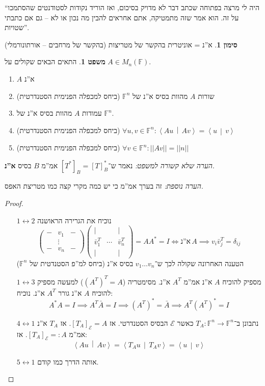 \documentclass[a4paper]{article}
\newcommand\ec    {\mathcal{E}}
\newcommand\ra    {\rangle}
\newcommand\la    {\langle}
\newcommand\lra       {\leftrightarrow}
\newcommand\F         {\mathbb{F}}
\newcommand\co        {\colon}
\newcommand\pms[1]    {\begin{pmatrix}
		#1
\end{pmatrix}}
\newcommand\norm[1]   {\left \vert \left \vert #1 \right \vert \right \vert}
\newcommand\mut [2]   {\left \la #1 \,\middle\vert\, #2 \right \ra}
\newcommand\dg        {\delta}
\theoremstyle{definition}
\newtheorem{Theorem}{משפט}
\newtheorem{Notion}{סימון}
\newcommand\theo  [1] {\begin{Theorem}#1\end{Theorem}}
\newcommand\noti  [1] {\begin{Notion}#1\end{Notion}}
\begin{document}
	``היה לי מרצה בפתוחה שכתב דבר לא מדויק בסיכום, ואז הוריד נקודות לסטודנטים שהסתמכו על זה. הוא אמר שזה מתמטיקה, אתם אחראים להבין מה נכון או לא – גם אם כתבתי שטויות''. 
	
	
	\noti{א''נ = אוניטרית בהקשר של מטריצות (בהקשר של מרחבים – אורתונורמלי)}
	\theo{התאים הבאים שקולים על $A \in M_n(\F)$. 
		\begin{enumerate}
			\item $A$ א''נ
			\item שורות $A$ מהוות בסיס א''נ של $\F^n$ (ביחס למכפלה הפנימית הסטנדרטית)
			\item עמודות $A$ מהוות בסיס א''נ של $\F^n$. 
			\item (ביחס למכפלה הפנימית הסטנדרטית) \hfill $\forall u, v \in \F^n \co \mut{Au}{Av} = \mut{u}{v}$
			\item (ביחס למכפלה הפנימית הסטנדרטית) \hfill $\forall v \in \F^n \co \norm{Av} = \norm{n}$
	\end{enumerate}}
	\textit{הערה שלא קשורה למשפט: }נאמר ש־$[T^*]_B = [T]_B^*$ אמ''מ $B$ בסיס \textbf{א''נ}. 
	
	\textit{הערה נוספת: }זה בערך אמ''מ כי יש כמה מקרי קצה כמו מטריצת האפס. 
	
	\begin{proof}\,
		\begin{itemize}
			\item[$1 \lra 2$] נוכיח את הגרירה הראושנה
			\[ \pms{- & v_1 & - \\ & \vdots \\ - & v_n & -}\pms{\vert & & \vert\\ \bar v_1^T & \cdots & \bar v_n^T \\ \vert & & \vert} = AA^* = I \iff \text{א''נ}\, A \implies v_i \bar v_j^T = \dg_{ij} \] 
			הטענה האחרונה שקולה לכך ש־$v_1 \dots v_n$ בסיס א''נ (ביחס למ''פ הסטנדטית של $\F^n$)
			\item[$1 \lra 3$]מספיק להוכיח $A$ א''נ אמ''מ $A^T$ א''נ. מסימטריה ($(A^T)^T = A$) למעשה מספיק להוכיח $A$ א''נ גורר $A^T$ א''נ. נוכיח: 
			\[ A^*A = I \implies A^T\bar A = I \implies (A^T)^* = \bar A \implies A^T(A^T)^* = I \]
			\item[$4 \lra 1$]נתבונן ב־$T_A \co \F^n \to \F^n$ כאשר $\ec$ הבסיס הסטנדרטי. אז $[T_A]_{\ec} = A$. אז $T_A$ א''נ אמ''מ $[T_A]_{\ec} =: A$. אז: 
			\[ \mut{Au}{Av} = \mut{T_Au}{T_Av} = \mut{u}{v} \]
			\item[$5 \lra 1$] אותה הדרך כמו קודם. 
		\end{itemize}
	\end{proof}
	
\end{document}
